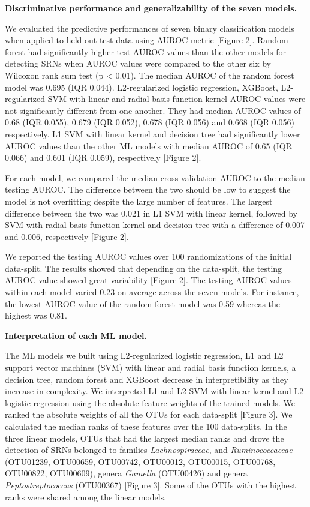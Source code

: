\documentclass[11pt,]{article}
\begin{document}
\textbf{Discriminative performance and generalizability of the seven
models.}

We evaluated the predictive performances of seven binary classification
models when applied to held-out test data using AUROC metric {[}Figure
2{]}. Random forest had significantly higher test AUROC values than the
other models for detecting SRNs when AUROC values were compared to the
other six by Wilcoxon rank sum test (p \textless{} 0.01). The median
AUROC of the random forest model was 0.695 (IQR 0.044). L2-regularized
logistic regression, XGBoost, L2-regularized SVM with linear and radial
basis function kernel AUROC values were not significantly different from
one another. They had median AUROC values of 0.68 (IQR 0.055), 0.679
(IQR 0.052), 0.678 (IQR 0.056) and 0.668 (IQR 0.056) respectively. L1
SVM with linear kernel and decision tree had significantly lower AUROC
values than the other ML models with median AUROC of 0.65 (IQR 0.066)
and 0.601 (IQR 0.059), respectively {[}Figure 2{]}.

For each model, we compared the median cross-validation AUROC to the
median testing AUROC. The difference between the two should be low to
suggest the model is not overfitting despite the large number of
features. The largest difference between the two was 0.021 in L1 SVM
with linear kernel, followed by SVM with radial basis function kernel
and decision tree with a difference of 0.007 and 0.006, respectively
{[}Figure 2{]}.

We reported the testing AUROC values over 100 randomizations of the
initial data-split. The results showed that depending on the data-split,
the testing AUROC value showed great variability {[}Figure 2{]}. The
testing AUROC values within each model varied 0.23 on average across the
seven models. For instance, the lowest AUROC value of the random forest
model was 0.59 whereas the highest was 0.81.

\textbf{Interpretation of each ML model.}

The ML models we built using L2-regularized logistic regression, L1 and
L2 support vector machines (SVM) with linear and radial basis function
kernels, a decision tree, random forest and XGBoost decrease in
interpretibility as they increase in complexity. We interpreted L1 and
L2 SVM with linear kernel and L2 logistic regression using the absolute
feature weights of the trained models. We ranked the absolute weights of
all the OTUs for each data-split {[}Figure 3{]}. We calculated the
median ranks of these features over the 100 data-splits. In the three
linear models, OTUs that had the largest median ranks and drove the
detection of SRNs belonged to families \emph{Lachnospiraceae}, and
\emph{Ruminococcaceae} (OTU01239, OTU00659, OTU00742, OTU00012,
OTU00015, OTU00768, OTU00822, OTU00609), genera \emph{Gamella}
(OTU00426) and genera \emph{Peptostreptococcus} (OTU00367) {[}Figure
3{]}. Some of the OTUs with the highest ranks were shared among the
linear models.
\end{document}
